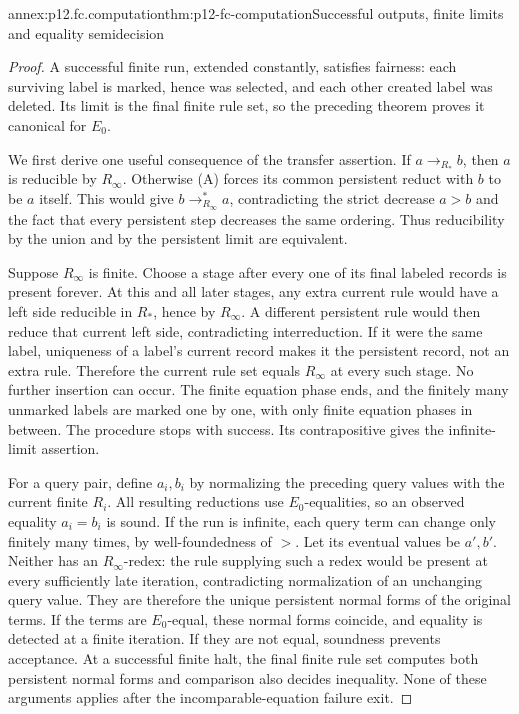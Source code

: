 \begin{annexitem}{annex:p12.fc.computation}{thm:p12-fc-computation}{Successful outputs, finite limits and equality semidecision}
\begin{proof}
A successful finite run, extended constantly, satisfies fairness:
each surviving label is marked, hence was selected, and each other
created label was deleted. Its limit is the final finite rule set,
so the preceding theorem proves it canonical for \(E_0\).

We first derive one useful consequence of the transfer assertion.
If \(a\to_{R_*}b\), then \(a\) is reducible by
\(R_\infty\). Otherwise (A) forces its common persistent
reduct with \(b\) to be \(a\) itself. This would give
\(b\to_{R_\infty}^*a\), contradicting the strict decrease
\(a>b\) and the fact that every persistent step decreases
the same ordering. Thus reducibility by the union and by the
persistent limit are equivalent.

Suppose \(R_\infty\) is finite. Choose a stage after every one
of its final labeled records is present forever. At this and all
later stages, any extra current rule would have a left side
reducible in \(R_*\), hence by \(R_\infty\). A different
persistent rule would then reduce that current left side,
contradicting interreduction. If it were the same label, uniqueness
of a label's current record makes it the persistent record, not
an extra rule. Therefore the current rule set equals
\(R_\infty\) at every such stage.
No further insertion can occur. The finite equation phase ends,
and the finitely many unmarked labels are marked one by one,
with only finite equation phases in between. The procedure stops
with success. Its contrapositive gives the infinite-limit assertion.

For a query pair, define \(a_i,b_i\) by normalizing the preceding
query values with the current finite \(R_i\). All resulting
reductions use \(E_0\)-equalities, so an observed equality
\(a_i=b_i\) is sound. If the run is infinite, each query term
can change only finitely many times, by well-foundedness of \(>\).
Let its eventual values be \(a',b'\). Neither has an
\(R_\infty\)-redex: the rule supplying such a redex would be
present at every sufficiently late iteration, contradicting
normalization of an unchanging query value. They are therefore
the unique persistent normal forms of the original terms.
If the terms are \(E_0\)-equal, these normal forms coincide,
and equality is detected at a finite iteration. If they are not
equal, soundness prevents acceptance. At a successful finite halt,
the final finite rule set computes both persistent normal forms
and comparison also decides inequality. None of these arguments
applies after the incomparable-equation failure exit.
\end{proof}
\end{annexitem}

